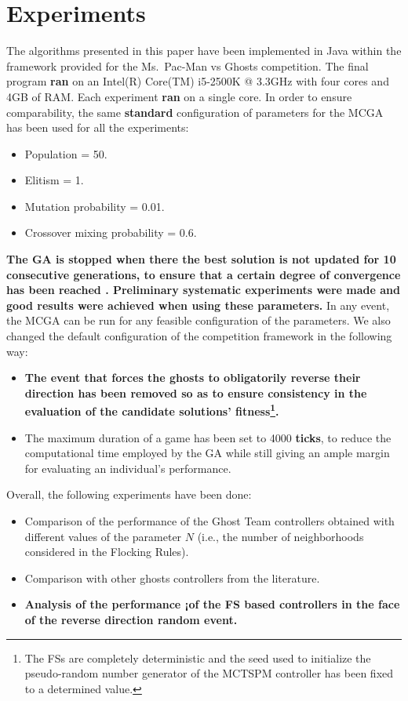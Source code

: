 \documentclass[journal]{IEEEtran}
\begin{document}
\section{Experiments}
\label{sec:Experiments}
The algorithms presented in this paper have been implemented in Java within the framework provided for the Ms.\  Pac-Man vs Ghosts competition. The final program \textbf{ran} on an Intel(R) Core(TM) i5-2500K @ 3.3GHz with four cores and 4GB of RAM. Each experiment \textbf{ran} on a single core. In order to ensure comparability, the same \textbf{standard} configuration of parameters for the MCGA has been used for all the experiments:

\begin{itemize}
  \item Population = 50.
  \item Elitism = 1.
  \item Mutation probability = 0.01.
  \item Crossover mixing probability = 0.6.
\end{itemize}

\textbf{The GA is stopped when there the best solution is not updated for 10 consecutive generations, to ensure that a certain degree of convergence has been reached \cite{Karma2003, Safe2004}. Preliminary systematic experiments were made and good results were achieved when using these parameters.} In any event, the MCGA can be run for any feasible configuration of the parameters.  We also changed the default configuration of the competition framework in the following way:

\begin{itemize}
  \item \textbf{The event that forces the ghosts to obligatorily reverse their direction has been removed so as to ensure consistency in the evaluation of the candidate solutions' fitness\footnote{The FSs are completely deterministic and the seed used to initialize the pseudo-random number generator of the MCTSPM controller has been fixed to a determined value.}.}
  \item The maximum duration of a game has been set to 4000 \textbf{ticks}, to reduce the computational time employed by the GA while still giving an ample margin for evaluating an individual's performance.
\end{itemize}

Overall, the following experiments have been done:

\begin{itemize}
  \item Comparison of the performance of the Ghost Team controllers obtained with different values of the parameter $N$ (i.e., the number of neighborhoods considered in the Flocking Rules).
  \item Comparison with other ghosts controllers from the literature.
  \item \textbf{Analysis of the performance ¡of the FS based controllers in the face of the reverse direction random event.}
\end{itemize}
\end{document}
